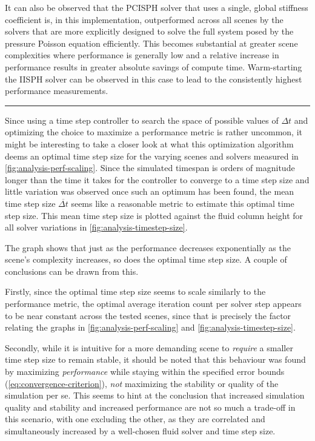 \documentclass[oneside, a4paper]{book}
\newcommand\horizontalspacer[0]{\vspace{5pt}\noindent\textcolor{lightgray}{\rule{\textwidth}{1mm}}
\vspace{5pt}}
\begin{document}
  It can also be observed that the PCISPH solver that uses a single, global stiffness coefficient is, in this implementation, outperformed across all scenes by the solvers that are more explicitly designed to solve the full system posed by the pressure Poisson equation efficiently. This becomes substantial at greater scene complexities where performance is generally low and a relative increase in performance results in greater absolute savings of compute time. Warm-starting the IISPH solver can be observed in this case to lead to the consistently highest performance measurements.

  \horizontalspacer

  Since using a time step controller to search the space of possible values of $\Delta t$ and optimizing the choice to maximize a performance metric is rather uncommon, it might be interesting to take a closer look at what this optimization algorithm deems an optimal time step size for the varying scenes and solvers measured in \autoref{fig:analysis-perf-scaling}. Since the simulated timespan is orders of magnitude longer than the time it takes for the controller to converge to a time step size and little variation was observed once such an optimum has been found, the mean time step size $\overline{\Delta t}$ seems like a reasonable metric to estimate this optimal time step size. This mean time step size is plotted against the fluid column height for all solver variations in \autoref{fig:analysis-timestep-size}. 
  
  The graph shows that just as the performance decreases exponentially as the scene's complexity increases, so does the optimal time step size. A couple of conclusions can be drawn from this. 
  
  Firstly, since the optimal time step size seems to scale similarly to the performance metric, the optimal average iteration count per solver step appears to be near constant across the tested scenes, since that is precisely the factor relating the graphs in \autoref{fig:analysis-perf-scaling} and \autoref{fig:analysis-timestep-size}. 

  Secondly, while it is intuitive for a more demanding scene to \textit{require} a smaller time step size to remain stable, it should be noted that this behaviour was found by maximizing \textit{performance} while staying within the specified error bounds (\autoref{eq:convergence-criterion}), \textit{not} maximizing the stability or quality of the simulation per se. This seems to hint at the conclusion that increased simulation quality and stability and increased performance are not so much a trade-off in this scenario, with one excluding the other, as they are correlated and simultaneously increased by a well-chosen fluid solver and time step size.
\end{document}
